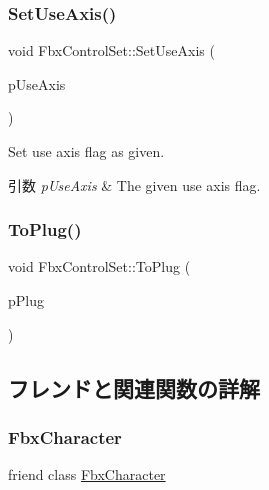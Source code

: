 \subsubsection{\texorpdfstring{Set\+Use\+Axis()}{SetUseAxis()}}
{\footnotesize\ttfamily void Fbx\+Control\+Set\+::\+Set\+Use\+Axis (\begin{DoxyParamCaption}\item[{bool}]{p\+Use\+Axis }\end{DoxyParamCaption})}

Set use axis flag as given. 
\begin{DoxyParams}{引数}
{\em p\+Use\+Axis} & The given use axis flag. \\
\hline
\end{DoxyParams}
\mbox{\label{class_fbx_control_set_aa498d71226be996497662a04f2f3f68d}} 
\subsubsection{\texorpdfstring{To\+Plug()}{ToPlug()}}
{\footnotesize\ttfamily void Fbx\+Control\+Set\+::\+To\+Plug (\begin{DoxyParamCaption}\item[{\hyperlink{class_fbx_control_set_plug}{Fbx\+Control\+Set\+Plug} $\ast$}]{p\+Plug }\end{DoxyParamCaption})}



\subsection{フレンドと関連関数の詳解}
\mbox{\label{class_fbx_control_set_abcc889edc85f236c5ab060bb37663168}} 
\subsubsection{\texorpdfstring{Fbx\+Character}{FbxCharacter}}
{\footnotesize\ttfamily friend class \hyperlink{class_fbx_character}{Fbx\+Character}\hspace{0.3cm}{\ttfamily [friend]}}

\mbox{\label{class_fbx_control_set_a7b27a89b3d5b45cd1a28960c77e4880b}} 
